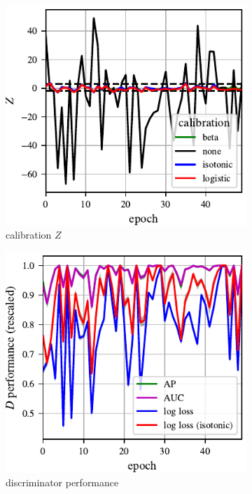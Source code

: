 \documentclass{article}
\begin{document}
\begin{figure}
    \centering
    \begin{subfigure}[b]{0.49\textwidth}
       \centering
       \includegraphics[scale=0.9]{figures/disc_calib.pdf}
       \caption{calibration $Z$}
       \label{fig:calibration stat}
    \end{subfigure}
    \begin{subfigure}[b]{0.49\textwidth}
       \centering
       \includegraphics[scale=0.9]{figures/disc_perf.pdf}
       \caption{discriminator performance}
       \label{fig:discriminator_perf}
    \end{subfigure}
    \caption{{\small
}}
\end{figure}
\end{document}
